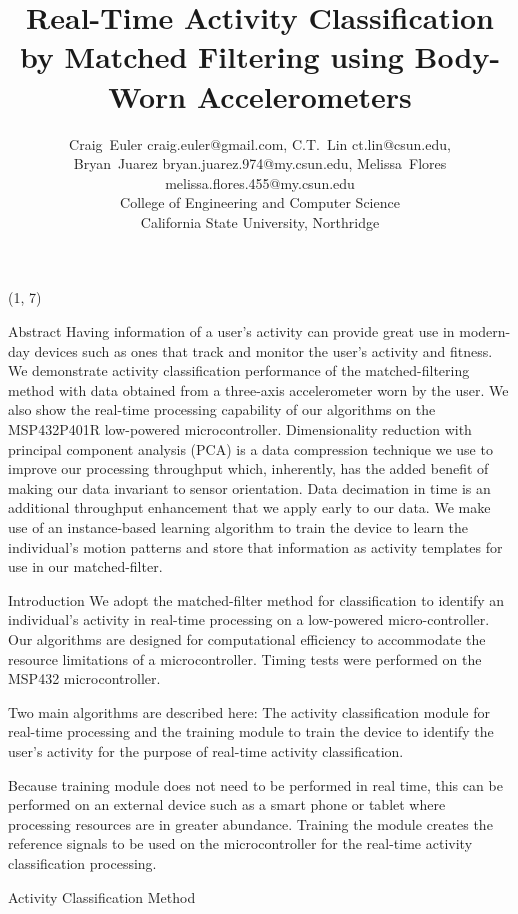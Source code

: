 \documentclass[unknownkeysallowed,final]{beamer}
\title{\normalsize{Real-Time Activity Classification by Matched Filtering using Body-Worn Accelerometers}}
\author{\small{Craig~Euler craig.euler@gmail.com, C.T.~Lin ct.lin@csun.edu,\\Bryan~Juarez bryan.juarez.974@my.csun.edu, Melissa~Flores melissa.flores.455@my.csun.edu\\College of Engineering and Computer Science\\California State University, Northridge}}
\date{}
\begin{document}
\tiny{}
\begin{frame}{} 

\begin{textblock}{19.5}(1, 7)

\begin{block}{\small{Abstract}}
Having information of a user's activity can provide great use in modern-day devices such as ones that track and monitor the user's activity and fitness.
We demonstrate activity classification performance of the matched-filtering method with data obtained from a three-axis accelerometer worn by the user.
We also show the real-time processing capability of our algorithms on the MSP432P401R low-powered microcontroller.
Dimensionality reduction with principal component analysis (PCA) \cite{bishop_2006} is a data compression technique we use to improve our processing throughput which, inherently, has the added benefit of making     our data invariant to sensor orientation.
Data decimation in time is an additional throughput enhancement that we apply early to our data.
We make use of an instance-based learning algorithm to train the device to learn the individual's motion patterns and store that information as activity templates for use in our matched-filter.
\end{block}

\begin{block}{\small{Introduction}}
We adopt the matched-filter method for classification to identify an individual's activity in real-time processing on a low-powered micro-controller.
Our algorithms are designed for computational efficiency to accommodate the resource limitations of a microcontroller.
Timing tests were performed on the MSP432 microcontroller.

Two main algorithms are described here: The activity classification module for real-time processing and the training module to train the device to identify the user's activity for the purpose of real-time activity classification.

Because training module does not need to be performed in real time, this can be performed on an external device such as a smart phone or tablet where processing resources are in greater abundance.
Training the module creates the reference signals to be used on the microcontroller for the real-time activity classification processing.
\end{block}

\begin{block}{\small{Activity Classification Method}}


\end{block}
\end{textblock}
\end{frame}
\end{document}
